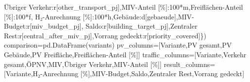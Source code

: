 \documentclass[
  ngerman,
  a4paper,
  DIV=11]{scrreprt}
\newenvironment{Shaded}{\begin{snugshade}}{\end{snugshade}}
\newcommand{\DecValTok}[1]{\textcolor[rgb]{0.68,0.00,0.00}{#1}}
\newcommand{\NormalTok}[1]{\textcolor[rgb]{0.00,0.23,0.31}{#1}}
\newcommand{\OperatorTok}[1]{\textcolor[rgb]{0.37,0.37,0.37}{#1}}
\newcommand{\StringTok}[1]{\textcolor[rgb]{0.13,0.47,0.30}{#1}}
\begin{document}
\begin{Shaded}
\begin{Highlighting}[]
                     \StringTok{\textquotesingle{}Übriger Verkehr\textquotesingle{}}\NormalTok{:r[}\StringTok{\textquotesingle{}other\_transport\_pj\textquotesingle{}}\NormalTok{],}\StringTok{\textquotesingle{}MIV{-}Anteil [\%]\textquotesingle{}}\NormalTok{:}\DecValTok{100}\OperatorTok{*}\NormalTok{m,}\StringTok{\textquotesingle{}Freiflächen{-}Anteil [\%]\textquotesingle{}}\NormalTok{:}\DecValTok{100}\OperatorTok{*}\NormalTok{f,}
                     \StringTok{\textquotesingle{}H₂{-}Anrechnung [\%]\textquotesingle{}}\NormalTok{:}\DecValTok{100}\OperatorTok{*}\NormalTok{h,}\StringTok{\textquotesingle{}Gebäude\textquotesingle{}}\NormalTok{:d[}\StringTok{\textquotesingle{}gebaeude\textquotesingle{}}\NormalTok{],}\StringTok{\textquotesingle{}MIV{-}Budget\textquotesingle{}}\NormalTok{:r[}\StringTok{\textquotesingle{}miv\_budget\_pj\textquotesingle{}}\NormalTok{],}
                     \StringTok{\textquotesingle{}Saldo\textquotesingle{}}\NormalTok{:r[}\StringTok{\textquotesingle{}building\_target\_pj\textquotesingle{}}\NormalTok{],}\StringTok{\textquotesingle{}Zentraler Rest\textquotesingle{}}\NormalTok{:r[}\StringTok{\textquotesingle{}central\_after\_miv\_pj\textquotesingle{}}\NormalTok{],}\StringTok{\textquotesingle{}Vorrang gedeckt\textquotesingle{}}\NormalTok{:r[}\StringTok{\textquotesingle{}priority\_covered\textquotesingle{}}\NormalTok{]\})}
\NormalTok{comparison}\OperatorTok{=}\NormalTok{pd.DataFrame(variants)}
\NormalTok{pv\_columns}\OperatorTok{=}\NormalTok{[}\StringTok{\textquotesingle{}Variante\textquotesingle{}}\NormalTok{,}\StringTok{\textquotesingle{}PV gesamt\textquotesingle{}}\NormalTok{,}\StringTok{\textquotesingle{}PV Gebäude\textquotesingle{}}\NormalTok{,}\StringTok{\textquotesingle{}PV Freifläche\textquotesingle{}}\NormalTok{,}\StringTok{\textquotesingle{}Freiflächen{-}Anteil [\%]\textquotesingle{}}\NormalTok{]}
\NormalTok{traffic\_columns}\OperatorTok{=}\NormalTok{[}\StringTok{\textquotesingle{}Variante\textquotesingle{}}\NormalTok{,}\StringTok{\textquotesingle{}Verkehr gesamt\textquotesingle{}}\NormalTok{,}\StringTok{\textquotesingle{}ÖPNV\textquotesingle{}}\NormalTok{,}\StringTok{\textquotesingle{}MIV\textquotesingle{}}\NormalTok{,}\StringTok{\textquotesingle{}Übriger Verkehr\textquotesingle{}}\NormalTok{,}\StringTok{\textquotesingle{}MIV{-}Anteil [\%]\textquotesingle{}}\NormalTok{]}
\NormalTok{result\_columns}\OperatorTok{=}\NormalTok{[}\StringTok{\textquotesingle{}Variante\textquotesingle{}}\NormalTok{,}\StringTok{\textquotesingle{}H₂{-}Anrechnung [\%]\textquotesingle{}}\NormalTok{,}\StringTok{\textquotesingle{}MIV{-}Budget\textquotesingle{}}\NormalTok{,}\StringTok{\textquotesingle{}Saldo\textquotesingle{}}\NormalTok{,}\StringTok{\textquotesingle{}Zentraler Rest\textquotesingle{}}\NormalTok{,}\StringTok{\textquotesingle{}Vorrang gedeckt\textquotesingle{}}\NormalTok{]}

\end{Highlighting}
\end{Shaded}
\end{document}
